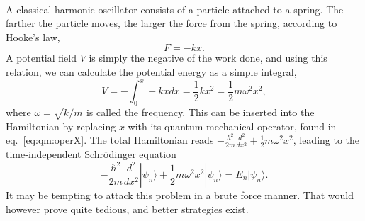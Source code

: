 \paragraph*{}
A classical harmonic oscillator consists of a particle attached to a spring.
The farther the particle moves, the larger the force from the spring, according
to Hooke's law,
\begin{equation}
F = -kx .
\end{equation}
A potential field $V$ is simply the negative of the work done, and using this relation, we can calculate the potential energy as a simple integral,
\begin{equation}
V = - \int_0^x -kx dx = \frac{1}{2} kx^2 = \frac{1}{2} m \omega^2 x^2,
\end{equation}
where $\omega = \sqrt{k/m}$ is called the frequency.
This can be inserted into the Hamiltonian by replacing $x$ with its quantum
mechanical operator, found in eq.~\eqref{eq:qm:operX}. The total Hamiltonian reads 
$-\frac{\hbar^2}{2m}\frac{d^2}{dx^2} + \frac{1}{2} m \omega^2 x^2$, leading to
the time-independent Schrödinger equation
\begin{equation}
-\frac{\hbar^2}{2m}\frac{d^2}{dx^2}|\psi_n\rangle + \frac{1}{2} m \omega^2 x^2|\psi_n\rangle 
= E_n|\psi_n\rangle .
\end{equation}
It may be tempting to attack this problem in a brute force manner.
That would however prove quite tedious, and better strategies exist.


